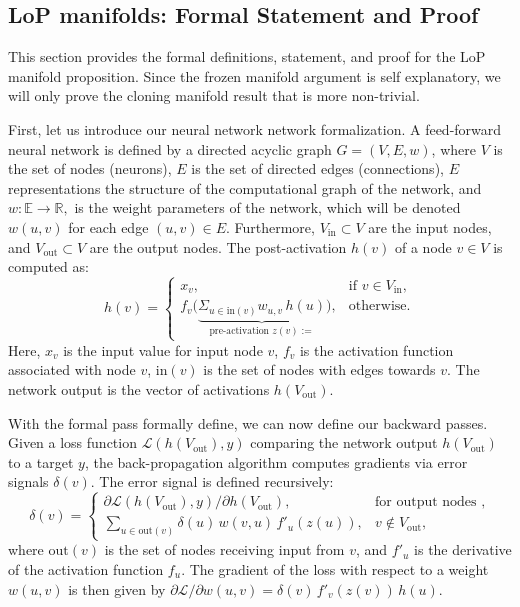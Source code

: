 \documentclass{article}
\newcommand{\Loss}{\mathcal{L}}
\newcommand{\R}{\mathbb{R}}
\newcommand{\E}{\mathbb{E}}
\numberwithin{figure}{section}
\begin{document}
\subsection{LoP manifolds: Formal Statement and Proof}
\label{app:cloning_manifold_details}

This section provides the formal definitions, statement, and proof for the LoP manifold proposition. Since the frozen manifold argument is self explanatory, we will only prove the cloning manifold result that is more non-trivial. 


First, let us introduce our neural network network formalization. 
A feed-forward neural network is defined by a directed acyclic graph $G=(V,E, w)$, where $V$ is the set of nodes (neurons), $E$ is the set of directed edges (connections), $E$ representations the structure of the computational graph of the network, and  $w:\E \to \R,$ is the weight parameters of the network, which will be denoted $w(u,v)$ for each edge $(u,v)\in E$. Furthermore, $V_{\text{in}} \subset V$ are the input nodes, and $V_{\text{out}} \subset V$ are the output nodes. The post-activation $h(v)$ of a node $v \in V$ is computed as:
\[
h(v)=
\begin{cases}
x_v, & \text{if } v\in V_{\text{in}},\\
f_v \Big(\underbrace{\Sigma_{u\in \text{in}(v)}w_{u,v}\,h(u)}_{\text{pre-activation }z(v):=}\Big), &\text{otherwise}.
\end{cases}
\]
Here, $x_v$ is the input value for input node $v$, $f_v$ is the activation function associated with node $v$, $\mathrm{in}(v)$ is the set of nodes with edges towards $v.$ The network output is the vector of activations $h(V_{\text{out}})$. 

With the formal pass formally define, we can now define our backward passes.  Given a loss function $\Loss(h(V_{\text{out}}),y)$ comparing the network output $h(V_{\text{out}})$ to a target $y$, the back-propagation algorithm computes gradients via error signals $\delta(v)$. The error signal is defined recursively:
\[
\delta(v)=
\begin{cases}
\partial\Loss(h(V_{\text{out}}),y)/\partial h(V_{\text{out}}), & \text{for output nodes },\\[4pt]
\displaystyle\sum_{u\in\mathrm{out}(v)}\delta(u)\,w(v,u)\,f'_u(z(u)), &v\notin V_{\text{out}},
\end{cases}
\]
where $\mathrm{out}(v)$ is the set of nodes receiving input from $v$, and $f'_u$ is the derivative of the activation function $f_u$. The gradient of the loss with respect to a weight $w(u,v)$ is then given by $\partial\Loss/\partial w(u,v)=\delta(v)\,f'_v(z(v))\,h(u)$.
\end{document}
